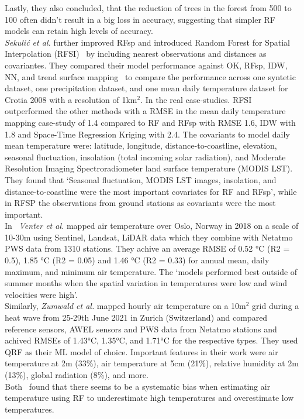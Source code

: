 Lastly, they also concluded, that the reduction of trees in the forest from 500 to 100 often didn't result in a big loss in accuracy, suggesting that simpler RF models can retain high levels of accuracy.\\
\textit{Sekuli{\'c} et al.} further improved RFsp and introduced Random Forest for Spatial Interpolation (RFSI)~\cite{sekulic2020random} by including nearest observations and distances as covariantes. They compared their model performance against OK, RFsp, IDW, NN, and trend surface mapping~\cite{chorley1965trend} to compare the performance across one syntetic dataset, one precipitation dataset, and one mean daily temperature dataset for Crotia 2008 with a resolution of 1km$^2$. In the real case-studies. RFSI outperformed the other methods with a RMSE in the mean daily temperature mapping case-study of 1.4 compared to RF and RFsp with RMSE 1.6, IDW with 1.8 and Space-Time Regression Kriging with 2.4. The covariants to model daily mean temperature were: latitude, longitude, distance-to-coastline, elevation, seasonal fluctuation, insolation (total incoming solar radiation), and Moderate Resolution Imaging Spectroradiometer land surface temperature (MODIS LST). They found that `Seasonal fluctuation, MODIS LST images, insolation, and distance-to-coastline were the most important covariates for RF and RFsp', while in RFSP the observations from ground stations as covariants were the most important.\\
In~\cite{venter2020hyperlocal} \textit{Venter et al.} mapped air temperature over Oslo, Norway in 2018 on a scale of 10-30m using Sentinel, Landsat, LiDAR data which they combine with Netatmo PWS data from 1310 stations. They achive an average RMSE of 0.52 °C (R2 = 0.5), 1.85 °C (R2 = 0.05) and 1.46 °C (R2 = 0.33) for annual mean, daily maximum, and minimum air temperature. The `models performed best outside of summer months when the spatial variation in temperatures were low and wind velocities were high'.\\
Similarly, \textit{Zumwald et al.} mapped hourly air temperature on a 10m$^2$ grid during a heat wave from 25-29th June 2021 in Zurich (Switzerland) and compared reference sensors, AWEL sensors and PWS data from Netatmo stations and achived RMSEs of 1.43°C, 1.35°C, and 1.71°C for the respective types. They used QRF as their ML model of choice. Important features in their work were air temperature at 2m (33\%), air temperature at 5cm (21\%), relative humidity at 2m (13\%), global radiation (8\%), and more.\\
Both~\cite{zumwald2021mapping, zhang2012bias} found that there seems to be a systematic bias when estimating air temperature using RF to underestimate high temperatures and overestimate low temperatures.

